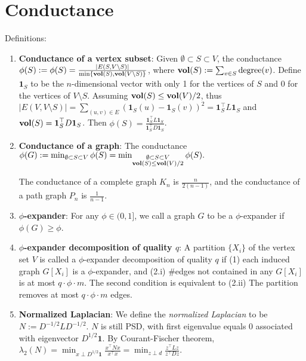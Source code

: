 \section{Conductance}

Definitions:
\begin{enumerate}
    \item \textbf{Conductance of a vertex subset}: Given $\emptyset \subset S \subset V$, the conductance $\phi(S) := \phi(S)=\frac{|E(S, V \backslash S)|}{\min \{\operatorname{\textbf{vol}}(S), \operatorname{\textbf{vol}}(V \backslash S)\}}$, where $\operatorname{\textbf{vol}}(S) := \sum_{v \in S} \text{degree}(v)$. Define $\boldsymbol{1}_S$ to be the $n$-dimensional vector with only 1 for the vertices of $S$ and 0 for the vertices of $V \setminus S$. Assuming $\operatorname{\textbf{vol}}(S) \le \operatorname{\textbf{vol}}(V)/2$, thus $|E(V, V\setminus S)|= \sum_{(u,v)\in E} (\boldsymbol{1}_S(u) - \boldsymbol{1}_S(v))^2 = \boldsymbol{1}_S^\top L \boldsymbol{1}_S$ and $\operatorname{\textbf{vol}}(S) = \boldsymbol{1}_S^\top D \boldsymbol{1}_S$. Then $\phi(S) = \frac{\boldsymbol{1}_S^\top L \boldsymbol{1}_S}{\boldsymbol{1}_S^\top D \boldsymbol{1}_S}$.

    \item \textbf{Conductance of a graph}: The conductance $\phi(G) := \min_{\emptyset \subset S \subset V} \phi(S) = \min_{\substack{\emptyset \subset S \subset V \\ \operatorname{\textbf{vol}}(S)\le\operatorname{\textbf{vol}}(V)/2}} \phi(S).$
    
    The conductance of a complete graph $K_n$ is $\frac{n}{2(n-1)}$, and the conductance of a path graph $P_n$ is $\frac{1}{n-1}$.

    \item \textbf{$\phi$-expander}: For any $\phi \in (0,1]$, we call a graph $G$ to be a $\phi$-expander if $\phi(G)\ge \phi$.
    \item \textbf{$\phi$-expander decomposition of quality $q$}: A partition $\{X_i\}$ of the vertex set $V$ is called a $\phi$-expander decomposition of quality $q$ if (1) each induced graph $G[X_i]$ is a $\phi$-expander, and (2.i) \#edges not contained in any $G[X_i]$ is at most $q\cdot\phi\cdot m$. The second condition is equivalent to (2.ii) The partition removes at most $q\cdot\phi\cdot m$ edges.
    \item \textbf{Normalized Laplacian}: We define the \textit{normalized Laplacian} to be $N := D^{-1/2} L D^{-1/2}$. $N$ is still PSD, with first eigenvalue equals 0 associated with eigenvector $D^{1/2}\boldsymbol{1}$. By Courant-Fischer theorem, $\lambda_2(N) = \min_{x \perp D^{1/2}\boldsymbol{1}} \frac{x^\top N x}{x^\top x} = \min_{z \perp d} \frac{z^\top L z}{z^\top D z}$.
\end{enumerate}


